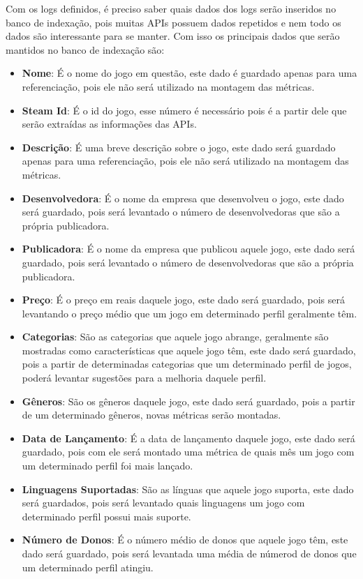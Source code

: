 Com os logs definidos, é preciso saber quais dados dos logs serão inseridos no banco de indexação, pois muitas APIs possuem dados repetidos e nem todo os dados são interessante para se manter. Com isso os principais dados que serão mantidos no banco de indexação são:
\begin{itemize}
	\item \textbf{Nome}: É o nome do jogo em questão, este dado é guardado apenas para uma referenciação, pois ele não será utilizado na montagem das métricas.
	\item \textbf{Steam Id}: É o id do jogo, esse número é necessário pois é a partir dele que serão extraídas as informações das APIs.
	\item \textbf{Descrição}: É uma breve descrição sobre o jogo, este dado será guardado apenas para uma referenciação, pois ele não será utilizado na montagem das métricas.
	\item \textbf{Desenvolvedora}: É o nome da empresa que desenvolveu o jogo, este dado será guardado, pois será levantado o número de desenvolvedoras que são a própria publicadora.
	\item \textbf{Publicadora}: É o nome da empresa que publicou aquele jogo, este dado será guardado, pois será levantado o número de desenvolvedoras que são a própria publicadora.
	\item \textbf{Preço}: É o preço em reais daquele jogo, este dado será guardado, pois será levantando o preço médio que um jogo em determinado perfil geralmente têm.
	\item \textbf{Categorias}: São as categorias que aquele jogo abrange, geralmente são mostradas como características que aquele jogo têm, este dado será guardado, pois a partir de determinadas categorias que um determinado perfil de jogos, poderá levantar sugestões para a melhoria daquele perfil.
	\item \textbf{Gêneros}: São os gêneros daquele jogo, este dado será guardado, pois a partir de um determinado gêneros, novas métricas serão montadas.
	\item \textbf{Data de Lançamento}: É a data de lançamento daquele jogo, este dado será guardado, pois com ele será montado uma métrica de quais mês um jogo com um determinado perfil foi mais lançado.
	\item \textbf{Linguagens Suportadas}: São as línguas que aquele jogo suporta, este dado será guardados, pois será levantado quais linguagens um jogo com determinado perfil possui mais suporte.
	\item \textbf{Número de Donos}: É o número médio de donos que aquele jogo têm, este dado será guardado, pois será levantada uma média de númerod de donos que um determinado perfil atingiu.

\end{itemize}
